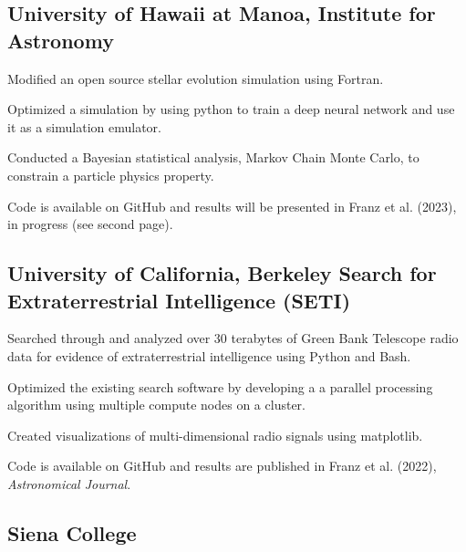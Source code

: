 \documentclass[a4paper, 12pt]{article}
\begin{document}
\subsection {{University of Hawaii at Manoa, Institute for Astronomy}}
\begin{zitemize}
\item Modified an open source stellar evolution simulation using Fortran.
\item Optimized a simulation by using python to train a deep neural network and use it as a simulation emulator.
\item Conducted a Bayesian statistical analysis, Markov Chain Monte Carlo, to constrain a particle physics property.
\item Code is available on GitHub and results will be presented in Franz et al. (2023), in progress (see second page).
\end{zitemize}

\vspace*{8pt}
\subsection {{University of California, Berkeley Search for Extraterrestrial Intelligence (SETI)}}
\begin{zitemize}
\item Searched through and analyzed over 30 terabytes of Green Bank Telescope radio data for evidence of extraterrestrial intelligence using Python and Bash.
\item Optimized the existing search software by developing a a parallel processing algorithm using multiple compute nodes on a cluster.
\item Created visualizations of multi-dimensional radio signals using matplotlib.
\item Code is available on GitHub and results are published in Franz et al. (2022), \textit{Astronomical Journal}.
\end{zitemize}

\vspace*{8pt}

\subsection {{Siena College}}
\vspace*{5pt}
\end{document}
